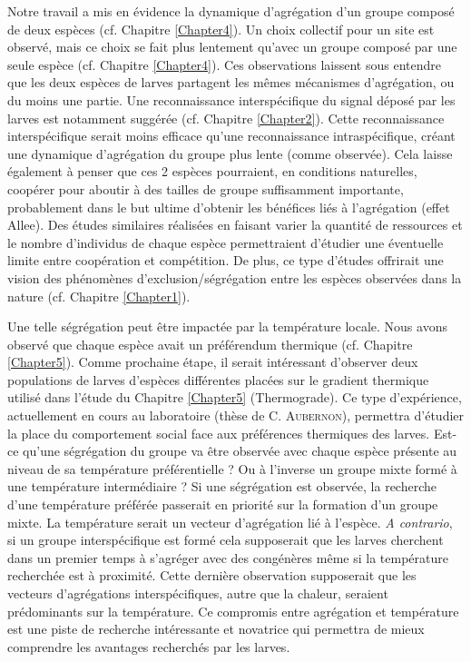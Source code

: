 Notre travail a mis en évidence la dynamique d'agrégation d'un groupe composé de deux espèces (cf. Chapitre \ref{Chapter4}). Un choix collectif pour un site est observé, mais ce choix se fait plus lentement qu'avec un groupe composé par une seule espèce (cf. Chapitre \ref{Chapter4}). Ces observations laissent sous entendre que les deux espèces de larves partagent les mêmes mécanismes d'agrégation, ou du moins une partie. Une reconnaissance interspécifique du signal déposé par les larves est notamment suggérée  (cf. Chapitre \ref{Chapter2}). Cette reconnaissance interspécifique serait moins efficace qu'une reconnaissance intraspécifique, créant une dynamique d'agrégation du groupe plus lente (comme observée). Cela laisse également à penser que ces 2 espèces pourraient, en conditions naturelles, coopérer pour aboutir à des tailles de groupe suffisamment importante, probablement dans le but ultime d'obtenir les bénéfices liés à l'agrégation (effet Allee). Des études similaires réalisées en faisant varier la quantité de ressources et le nombre d'individus de chaque espèce permettraient d'étudier une éventuelle limite entre coopération et compétition. De plus, ce type d'études offrirait une vision des phénomènes d'exclusion/ségrégation entre les espèces observées dans la nature (cf. Chapitre \ref{Chapter1}). 

Une telle ségrégation peut être impactée par la température locale. Nous avons observé que chaque espèce avait un préférendum thermique (cf. Chapitre \ref{Chapter5}). Comme prochaine étape, il serait intéressant d'observer deux populations de larves d'espèces différentes placées sur le gradient thermique utilisé dans l'étude du Chapitre \ref{Chapter5} (Thermograde). Ce type d'expérience, actuellement en cours au laboratoire (thèse de C. \textsc{Aubernon}), permettra d'étudier la place du comportement social face aux préférences thermiques des larves. Est-ce qu'une ségrégation du groupe va être observée avec chaque espèce présente au niveau de sa température préférentielle ? Ou à l'inverse un groupe mixte formé à une température intermédiaire ? Si une ségrégation est observée, la recherche d'une température préférée passerait en priorité sur la formation d'un groupe mixte. La température serait un vecteur d'agrégation lié à l'espèce. \textit{A contrario}, si un groupe interspécifique est formé cela supposerait que les larves cherchent dans un premier temps à s'agréger avec des congénères même si la température recherchée est à proximité. Cette dernière observation supposerait que les vecteurs d'agrégations interspécifiques, autre que la chaleur, seraient prédominants sur la température. Ce compromis entre agrégation et température est une piste de recherche intéressante et novatrice qui permettra de mieux comprendre les avantages recherchés par les larves.

